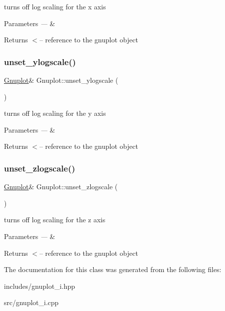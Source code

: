 turns off log scaling for the x axis


\begin{DoxyParams}{Parameters}
{\em ---} & \\
\hline
\end{DoxyParams}
\begin{DoxyReturn}{Returns}
$<$-- reference to the gnuplot object 
\end{DoxyReturn}
\mbox{\label{class_gnuplot_a9217543dd49c4802b1194d42c5e10b6d}} 
\subsubsection{\texorpdfstring{unset\+\_\+ylogscale()}{unset\_ylogscale()}}
{\footnotesize\ttfamily \hyperlink{class_gnuplot}{Gnuplot}\& Gnuplot\+::unset\+\_\+ylogscale (\begin{DoxyParamCaption}{ }\end{DoxyParamCaption})\hspace{0.3cm}{\ttfamily [inline]}}

turns off log scaling for the y axis


\begin{DoxyParams}{Parameters}
{\em ---} & \\
\hline
\end{DoxyParams}
\begin{DoxyReturn}{Returns}
$<$-- reference to the gnuplot object 
\end{DoxyReturn}
\mbox{\label{class_gnuplot_afa67f022ca344593b054d7f2e3406c7e}} 
\subsubsection{\texorpdfstring{unset\+\_\+zlogscale()}{unset\_zlogscale()}}
{\footnotesize\ttfamily \hyperlink{class_gnuplot}{Gnuplot}\& Gnuplot\+::unset\+\_\+zlogscale (\begin{DoxyParamCaption}{ }\end{DoxyParamCaption})\hspace{0.3cm}{\ttfamily [inline]}}

turns off log scaling for the z axis


\begin{DoxyParams}{Parameters}
{\em ---} & \\
\hline
\end{DoxyParams}
\begin{DoxyReturn}{Returns}
$<$-- reference to the gnuplot object 
\end{DoxyReturn}


The documentation for this class was generated from the following files\+:\begin{DoxyCompactItemize}
\item 
includes/gnuplot\+\_\+i.\+hpp\item 
src/gnuplot\+\_\+i.\+cpp\end{DoxyCompactItemize}
